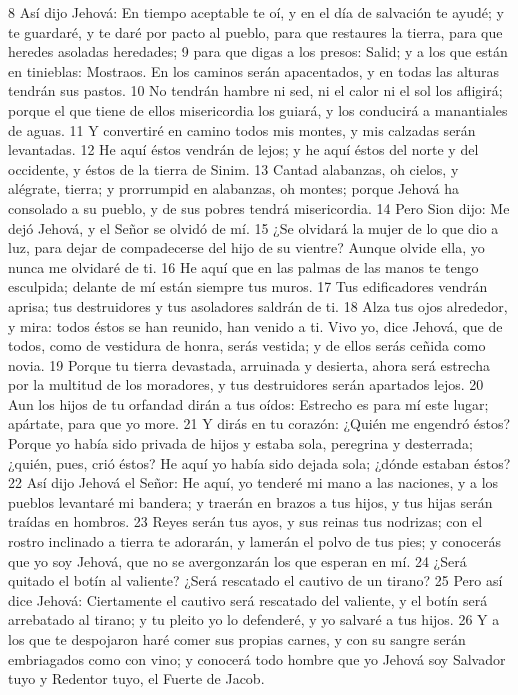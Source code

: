8 Así dijo Jehová: En tiempo aceptable te oí, y en el día de salvación te ayudé; y te guardaré, y te daré por pacto al pueblo, para que restaures la tierra, para que heredes asoladas heredades;
9 para que digas a los presos: Salid; y a los que están en tinieblas: Mostraos. En los caminos serán apacentados, y en todas las alturas tendrán sus pastos.
10 No tendrán hambre ni sed, ni el calor ni el sol los afligirá; porque el que tiene de ellos misericordia los guiará, y los conducirá a manantiales de aguas. 
11 Y convertiré en camino todos mis montes, y mis calzadas serán levantadas.
12 He aquí éstos vendrán de lejos; y he aquí éstos del norte y del occidente, y éstos de la tierra de Sinim.
13 Cantad alabanzas, oh cielos, y alégrate, tierra; y prorrumpid en alabanzas, oh montes; porque Jehová ha consolado a su pueblo, y de sus pobres tendrá misericordia.
14 Pero Sion dijo: Me dejó Jehová, y el Señor se olvidó de mí.
15 ¿Se olvidará la mujer de lo que dio a luz, para dejar de compadecerse del hijo de su vientre? Aunque olvide ella, yo nunca me olvidaré de ti.
16 He aquí que en las palmas de las manos te tengo esculpida; delante de mí están siempre tus muros.
17 Tus edificadores vendrán aprisa; tus destruidores y tus asoladores saldrán de ti.
18 Alza tus ojos alrededor, y mira: todos éstos se han reunido, han venido a ti. Vivo yo, dice Jehová, que de todos, como de vestidura de honra, serás vestida; y de ellos serás ceñida como novia.
19 Porque tu tierra devastada, arruinada y desierta, ahora será estrecha por la multitud de los moradores, y tus destruidores serán apartados lejos.
20 Aun los hijos de tu orfandad dirán a tus oídos: Estrecho es para mí este lugar; apártate, para que yo more.
21 Y dirás en tu corazón: ¿Quién me engendró éstos? Porque yo había sido privada de hijos y estaba sola, peregrina y desterrada; ¿quién, pues, crió éstos? He aquí yo había sido dejada sola; ¿dónde estaban éstos?
22 Así dijo Jehová el Señor: He aquí, yo tenderé mi mano a las naciones, y a los pueblos levantaré mi bandera; y traerán en brazos a tus hijos, y tus hijas serán traídas en hombros.
23 Reyes serán tus ayos, y sus reinas tus nodrizas; con el rostro inclinado a tierra te adorarán, y lamerán el polvo de tus pies; y conocerás que yo soy Jehová, que no se avergonzarán los que esperan en mí.
24 ¿Será quitado el botín al valiente? ¿Será rescatado el cautivo de un tirano?
25 Pero así dice Jehová: Ciertamente el cautivo será rescatado del valiente, y el botín será arrebatado al tirano; y tu pleito yo lo defenderé, y yo salvaré a tus hijos.
26 Y a los que te despojaron haré comer sus propias carnes, y con su sangre serán embriagados como con vino; y conocerá todo hombre que yo Jehová soy Salvador tuyo y Redentor tuyo, el Fuerte de Jacob.

